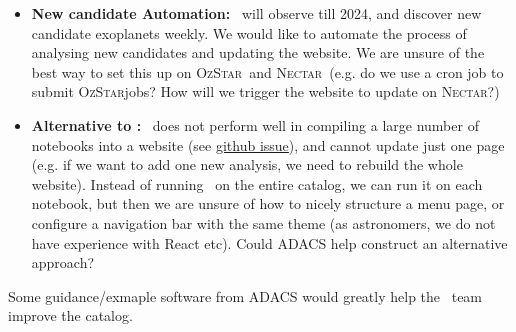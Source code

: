 \documentclass[floatfix,onecolumn]{aastex631}
\newcommand{\ozstar}{\textsc{OzStar}}
\newcommand{\nectar}{\textsc{Nectar}}
\begin{document}
\begin{itemize}
    \item \textbf{New candidate Automation:} \tess\ will observe till 2024, and discover new candidate exoplanets weekly. We would like to automate the process of analysing new candidates and updating the website. We are unsure of the best way to set this up on 
    \ozstar\ and \nectar\ (e.g. do we use a cron job to submit \ozstar jobs? How will we trigger the website to update on \nectar?)
    \item \textbf{Alternative to \jupyterbook:} \jupyterbook\ does not perform well in compiling a large number of notebooks into a website (see \href{https://github.com/executablebooks/jupyter-book/issues/1571}{github issue}), and cannot update just one page (e.g. if we want to add one new analysis, we need to rebuild the whole website). Instead of running \jupyterbook\ on the entire catalog, we can run it on each notebook, but then we are unsure of how to nicely structure a menu page, or configure a navigation bar with the same theme (as astronomers, we do not have experience with React etc). Could ADACS help construct an alternative approach?
\end{itemize}

Some guidance/exmaple software from ADACS would greatly help the \tessAtlas\ team improve the catalog.

\newpage


\end{document}
